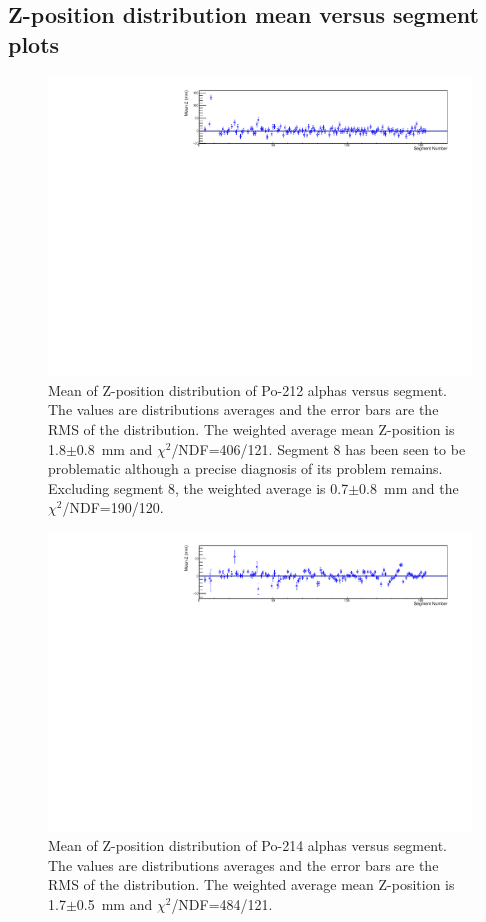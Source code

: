 \subsection{Z-position distribution mean versus segment plots}
\begin{figure}[!h]
	\centering
	\includegraphics[width=1.05\textwidth]{figures/PubBiPo212meanZvsCell.pdf}
	\caption{\label{fig:meanZvsCell212}Mean of Z-position distribution of Po-212 alphas versus segment. The values are distributions averages and the error bars are the RMS of the distribution. The weighted average mean Z-position is 1.8$\pm$0.8~mm and $\chi^2$/NDF=406/121. Segment 8 has been seen to be problematic although a precise diagnosis of its problem remains. Excluding segment 8, the weighted average is 0.7$\pm$0.8~mm and the $\chi^2$/NDF=190/120.  }
\end{figure}
\begin{figure}[!h]
	\centering
	\includegraphics[width=1.05\textwidth]{figures/PubBiPo214meanZvsCell.pdf}
	\caption{\label{fig:meanZvsCell214}Mean of Z-position distribution of Po-214 alphas versus segment. The values are distributions averages and the error bars are the RMS of the distribution. The weighted average mean Z-position is 1.7$\pm$0.5~mm and $\chi^2$/NDF=484/121.}
\end{figure}
\clearpage
\newpage
